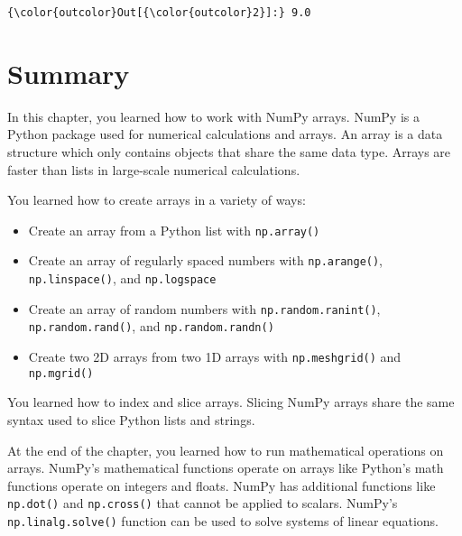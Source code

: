 \documentclass{book}
\providecommand{\tightlist}{%
      \setlength{\itemsep}{0pt}\setlength{\parskip}{0pt}}
\newcommand{\passthrough}[1]{#1}
\begin{document}
\begin{Verbatim}[commandchars=\\\{\}]
{\color{outcolor}Out[{\color{outcolor}2}]:} 9.0
\end{Verbatim}
            

    
        \newpage
        \hypertarget{summary}{%
\section{Summary}\label{summary}}

    




    
        In this chapter, you learned how to work with NumPy arrays. NumPy is a
Python package used for numerical calculations and arrays. An array is a
data structure which only contains objects that share the same data
type. Arrays are faster than lists in large-scale numerical
calculations.

You learned how to create arrays in a variety of ways:

\begin{itemize}
\tightlist
\item
  Create an array from a Python list with
  \passthrough{\lstinline!np.array()!}
\item
  Create an array of regularly spaced numbers with
  \passthrough{\lstinline!np.arange()!},
  \passthrough{\lstinline!np.linspace()!}, and
  \passthrough{\lstinline!np.logspace!}
\item
  Create an array of random numbers with
  \passthrough{\lstinline!np.random.ranint()!},
  \passthrough{\lstinline!np.random.rand()!}, and
  \passthrough{\lstinline!np.random.randn()!}
\item
  Create two 2D arrays from two 1D arrays with
  \passthrough{\lstinline!np.meshgrid()!} and
  \passthrough{\lstinline!np.mgrid()!}
\end{itemize}

You learned how to index and slice arrays. Slicing NumPy arrays share
the same syntax used to slice Python lists and strings.

At the end of the chapter, you learned how to run mathematical
operations on arrays. NumPy's mathematical functions operate on arrays
like Python's math functions operate on integers and floats. NumPy has
additional functions like \passthrough{\lstinline!np.dot()!} and
\passthrough{\lstinline!np.cross()!} that cannot be applied to scalars.
NumPy's \passthrough{\lstinline!np.linalg.solve()!} function can be used
to solve systems of linear equations.
    
\end{document}
